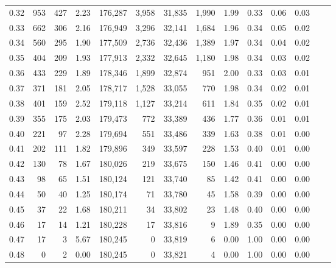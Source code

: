 \begin{tabular}{rrrrrrrrrrrrrr}
0.32 &     953 &    427 &    2.23 &  176,287 &    3,958 &  31,835 &   1,990 &  1.99 &  0.33 &  0.06 &      0.03 \\
0.33 &     662 &    306 &    2.16 &  176,949 &    3,296 &  32,141 &   1,684 &  1.96 &  0.34 &  0.05 &      0.02 \\
0.34 &     560 &    295 &    1.90 &  177,509 &    2,736 &  32,436 &   1,389 &  1.97 &  0.34 &  0.04 &      0.02 \\
0.35 &     404 &    209 &    1.93 &  177,913 &    2,332 &  32,645 &   1,180 &  1.98 &  0.34 &  0.03 &      0.02 \\
0.36 &     433 &    229 &    1.89 &  178,346 &    1,899 &  32,874 &     951 &  2.00 &  0.33 &  0.03 &      0.01 \\
0.37 &     371 &    181 &    2.05 &  178,717 &    1,528 &  33,055 &     770 &  1.98 &  0.34 &  0.02 &      0.01 \\
0.38 &     401 &    159 &    2.52 &  179,118 &    1,127 &  33,214 &     611 &  1.84 &  0.35 &  0.02 &      0.01 \\
0.39 &     355 &    175 &    2.03 &  179,473 &      772 &  33,389 &     436 &  1.77 &  0.36 &  0.01 &      0.01 \\
0.40 &     221 &     97 &    2.28 &  179,694 &      551 &  33,486 &     339 &  1.63 &  0.38 &  0.01 &      0.00 \\
0.41 &     202 &    111 &    1.82 &  179,896 &      349 &  33,597 &     228 &  1.53 &  0.40 &  0.01 &      0.00 \\
0.42 &     130 &     78 &    1.67 &  180,026 &      219 &  33,675 &     150 &  1.46 &  0.41 &  0.00 &      0.00 \\
0.43 &      98 &     65 &    1.51 &  180,124 &      121 &  33,740 &      85 &  1.42 &  0.41 &  0.00 &      0.00 \\
0.44 &      50 &     40 &    1.25 &  180,174 &       71 &  33,780 &      45 &  1.58 &  0.39 &  0.00 &      0.00 \\
0.45 &      37 &     22 &    1.68 &  180,211 &       34 &  33,802 &      23 &  1.48 &  0.40 &  0.00 &      0.00 \\
0.46 &      17 &     14 &    1.21 &  180,228 &       17 &  33,816 &       9 &  1.89 &  0.35 &  0.00 &      0.00 \\
0.47 &      17 &      3 &    5.67 &  180,245 &        0 &  33,819 &       6 &  0.00 &  1.00 &  0.00 &      0.00 \\
0.48 &       0 &      2 &    0.00 &  180,245 &        0 &  33,821 &       4 &  0.00 &  1.00 &  0.00 &      0.00 \\

\end{tabular}
